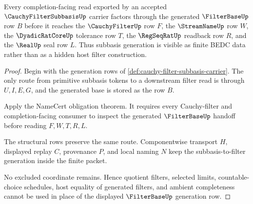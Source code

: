 \begin{theorem}
\label{thm:cauchy-filter-subbasis-filterbase-generation}
Every completion-facing read exported by an accepted $\CauchyFilterSubbasisUp$ carrier factors through the generated $\FilterBaseUp$ row $B$ before it reaches the $\CauchyFilterUp$ row $F$, the $\StreamNameUp$ row $W$, the $\DyadicRatCoreUp$ tolerance row $T$, the $\RegSeqRatUp$ readback row $R$, and the $\RealUp$ seal row $L$. Thus subbasis generation is visible as finite BEDC data rather than as a hidden host filter construction.
\end{theorem}
\begin{proof}
Begin with the generation rows of \autoref{def:cauchy-filter-subbasis-carrier}. The only route from primitive subbasis tokens to a downstream filter read is through $U,I,E,G$, and the generated base is stored as the row $B$.

Apply the NameCert obligation theorem. It requires every Cauchy-filter and completion-facing consumer to inspect the generated $\FilterBaseUp$ handoff before reading $F,W,T,R,L$.

The structural rows preserve the same route. Componentwise transport $H$, displayed replay $C$, provenance $P$, and local naming $N$ keep the subbasis-to-filter generation inside the finite packet.

No excluded coordinate remains. Hence quotient filters, selected limits, countable-choice schedules, host equality of generated filters, and ambient completeness cannot be used in place of the displayed $\FilterBaseUp$ generation row.
\end{proof}

